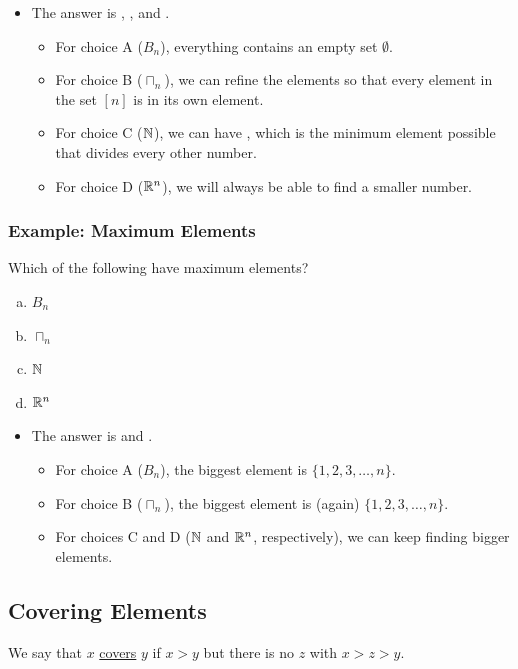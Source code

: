 \documentclass[letterpaper]{article}
\begin{document}
\begin{itemize}
    \item The answer is , , and .
    \begin{itemize}
        \item For choice A ($B_n$), everything contains an empty set $\emptyset$. 
        \item For choice B ($\sqcap_n$), we can refine the elements so that every element in the set $[n]$ is in its own element. 
        \item For choice C ($\mathbb{N}$), we can have , which is the minimum element possible that divides every other number. 
        \item For choice D ($\mathbb{R}^n$), we will always be able to find a smaller number. 
    \end{itemize}
\end{itemize}

\subsubsection{Example: Maximum Elements}
Which of the following have maximum elements? 
\begin{enumerate}[(a)]
    \item $B_n$
    \item $\sqcap_n$
    \item $\mathbb{N}$
    \item $\mathbb{R}^n$
\end{enumerate}

\begin{itemize}
    \item The answer is  and .
    \begin{itemize}
        \item For choice A ($B_n$), the biggest element is $\{1, 2, 3, \dots, n\}$.
        \item For choice B ($\sqcap_n$), the biggest element is (again) $\{1, 2, 3, \dots, n\}$.
        \item For choices C and D ($\mathbb{N}$ and $\mathbb{R}^n$, respectively), we can keep finding bigger elements. 
    \end{itemize}
\end{itemize}


\subsection{Covering Elements}
\begin{definition}{}{}
    We say that $x$ \underline{covers} $y$ if $x > y$ but there is no $z$ with $x > z > y$. 
\end{definition}
\end{document}
